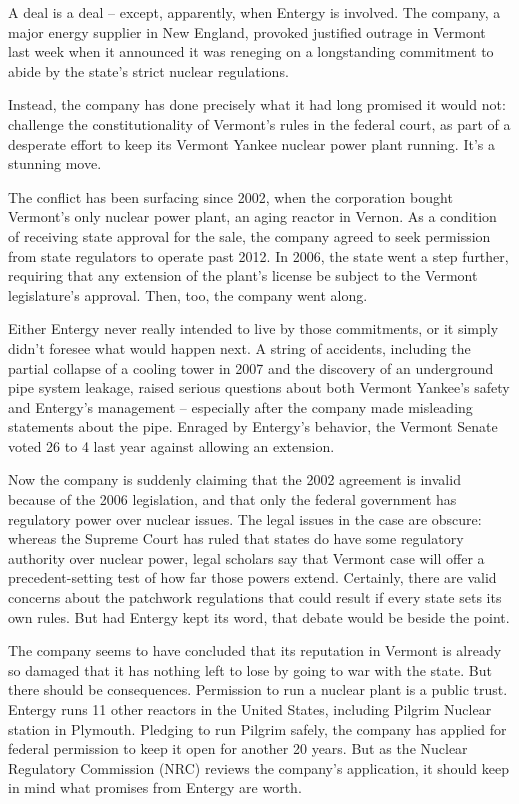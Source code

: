 A deal is a deal – except, apparently, when Entergy is involved. The company, a major energy supplier in New England, provoked justified outrage in Vermont last week when it announced it was reneging on a longstanding commitment to abide by the state's strict nuclear regulations.


Instead, the company has done precisely what it had long promised it would not: challenge the constitutionality of Vermont's rules in the federal court, as part of a desperate effort to keep its Vermont Yankee nuclear power plant running. It's a stunning move.


The conflict has been surfacing since 2002, when the corporation bought Vermont's only nuclear power plant, an aging reactor in Vernon. As a condition of receiving state approval for the sale, the company agreed to seek permission from state regulators to operate past 2012. In 2006, the state went a step further, requiring that any extension of the plant's license be subject to the Vermont legislature's approval. Then, too, the company went along.


Either Entergy never really intended to live by those commitments, or it simply didn't foresee what would happen next. A string of accidents, including the partial collapse of a cooling tower in 2007 and the discovery of an underground pipe system leakage, raised serious questions about both Vermont Yankee's safety and Entergy's management – especially after the company made misleading statements about the pipe. Enraged by Entergy's behavior, the Vermont Senate voted 26 to 4 last year against allowing an extension.


Now the company is suddenly claiming that the 2002 agreement is invalid because of the 2006 legislation, and that only the federal government has regulatory power over nuclear issues. The legal issues in the case are obscure: whereas the Supreme Court has ruled that states do have some regulatory authority over nuclear power, legal scholars say that Vermont case will offer a precedent-setting test of how far those powers extend. Certainly, there are valid concerns about the patchwork regulations that could result if every state sets its own rules. But had Entergy kept its word, that debate would be beside the point.


The company seems to have concluded that its reputation in Vermont is already so damaged that it has nothing left to lose by going to war with the state. But there should be consequences. Permission to run a nuclear plant is a public trust. Entergy runs 11 other reactors in the United States, including Pilgrim Nuclear station in Plymouth. Pledging to run Pilgrim safely, the company has applied for federal permission to keep it open for another 20 years. But as the Nuclear Regulatory Commission (NRC) reviews the company's application, it should keep in mind what promises from Entergy are worth.